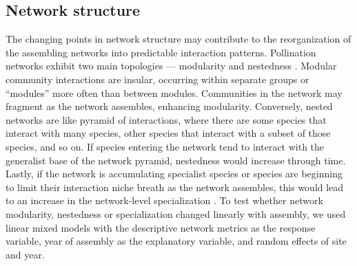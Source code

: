 \documentclass[12pt]{article}
\begin{document}

\subsection*{Network structure}

The changing points in network structure may contribute to the
reorganization of the assembling networks into predictable interaction
patterns. Pollination networks exhibit two main topologies ---
modularity \citep[e.g.,][]{Olesen2007} and nestedness
\citep[e.g.,][]{Bascompte2006, Bascompte2003}.  Modular community
interactions are insular, occurring within separate groups or
``modules'' more often than between modules. Communities in the
network may fragment as the network assembles, enhancing
modularity. Conversely, nested networks are like pyramid of
interactions, where there are some species that interact with many
species, other species that interact with a subset of those species,
and so on. If species entering the network tend to interact with the
generalist base of the network pyramid, nestedness would increase
through time. Lastly, if the network is accumulating specialist
species or species are beginning to limit their interaction niche
breath as the network assembles, this would lead to an increase in the
network-level specialization \citep{bluthgen-2006-9}. To test whether
network modularity, nestedness or specialization changed linearly with
assembly, we used linear mixed models with the descriptive network
metrics as the response variable, year of assembly as the explanatory
variable, and random effects of site and year.
\end{document}
